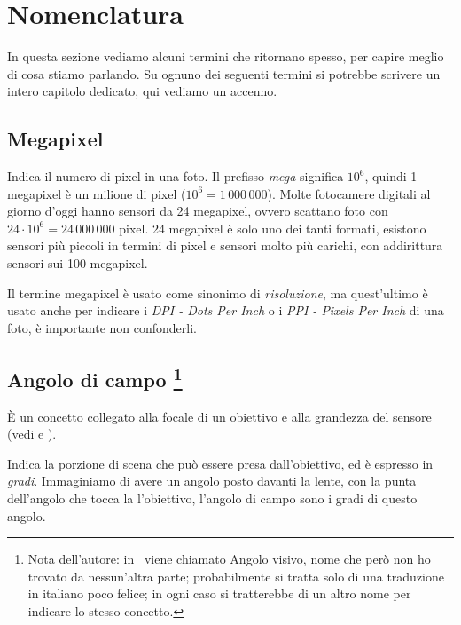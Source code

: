 \section{Nomenclatura} \label{sec:nomenclatura}

In questa sezione vediamo alcuni termini che ritornano spesso, per capire meglio di cosa stiamo parlando. Su ognuno dei seguenti termini si potrebbe scrivere un intero capitolo dedicato, qui vediamo un accenno.

\subsection{Megapixel} \label{subsec:megapixel}
Indica il numero di pixel in una foto. Il prefisso \textit{mega} significa $10^6$, quindi 1 megapixel è un milione di pixel ($10^6 = 1\,000\,000$).
Molte fotocamere digitali al giorno d'oggi hanno sensori da 24 megapixel, ovvero scattano foto con $24 \cdot 10^6 = 24\,000\,000$ pixel. 24 megapixel è solo uno dei tanti formati, esistono sensori più
piccoli in termini di pixel e sensori molto più carichi, con addirittura sensori sui 100 megapixel.

Il termine megapixel è usato come sinonimo di \textit{risoluzione}, ma quest'ultimo è usato anche per indicare i \textit{DPI - Dots Per Inch} o i \textit{PPI - Pixels Per Inch} di una foto, è importante non confonderli.


\subsection[Angolo di campo]{Angolo di campo \footnote{Nota dell'autore: in~\cite{gatcum2017manuale} viene chiamato Angolo visivo, nome che però non ho trovato da nessun'altra parte; probabilmente si tratta solo di una traduzione in italiano poco felice; in ogni caso si tratterebbe di un altro nome per indicare lo stesso concetto.}} \label{subsec:angolocampo}

È un concetto collegato alla focale di un obiettivo e alla grandezza del sensore (vedi  e ).

Indica la porzione di scena che può essere presa dall'obiettivo, ed è espresso in \textit{gradi}. Immaginiamo di avere un angolo posto davanti la lente, con la punta dell'angolo che tocca la l'obiettivo,
l'angolo di campo sono i gradi di questo angolo.

